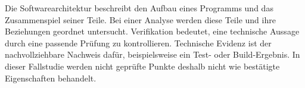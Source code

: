 \begin{beginnerstatement}

Die Softwarearchitektur beschreibt den Aufbau eines Programms und das
Zusammenspiel seiner Teile. Bei einer Analyse werden diese Teile und ihre
Beziehungen geordnet untersucht. Verifikation bedeutet, eine technische
Aussage durch eine passende Prüfung zu kontrollieren. Technische Evidenz ist
der nachvollziehbare Nachweis dafür, beispielsweise ein Test- oder
Build-Ergebnis. In dieser Fallstudie werden nicht geprüfte Punkte deshalb nicht
wie bestätigte Eigenschaften behandelt.

\end{beginnerstatement}
